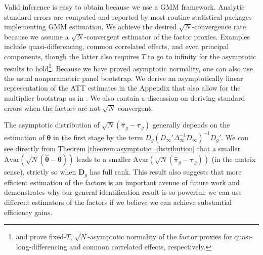 Valid inference is easy to obtain because we use a GMM framework. Analytic standard errors are computed and reported by most routine statistical packages implementing GMM estimation. We achieve the desired $\sqrt{N}$-convergence rate because we assume a $\sqrt{N}$-convergent estimator of the factor proxies. Examples include quasi-differencing, common correlated effects, and even principal components, though the latter also requires $T$ to go to infinity for the asymptotic results to hold\footnote{\citet{Ahn_Lee_Schmidt_2013} and \citet{Westerlund_Petrova_Norkute_2019} prove fixed-$T$, $\sqrt{N}$-asymptotic normality of the factor proxies for quasi-long-differencing and common correlated effects, respectively.}. Because we have proved asymptotic normality, one can also use the usual nonparametric panel bootstrap. We derive an asymptotically linear representation of the ATT estimates in the Appendix that also allow for the multiplier bootstrap as in \citet{Callaway_Karami_2020}. We also contain a discussion on deriving standard errors when the factors are not $\sqrt{N}$-convergent. 

The asymptotic distribution of $\sqrt{N}(\widehat{\bm \tau}_g - \bm \tau_{g})$ generally depends on the estimation of $\bm{\theta}$ in the first stage by the term $D_g (D_\infty' \Delta_\infty^{-1} D_\infty)^{-1} D_g'$. We can see directly from Theorem \ref{theorem:asymptotic_distribution} that a smaller $\text{Avar}(\sqrt{N}(\widehat{\bm{\theta}} - \bm{\theta}))$ leads to a smaller $\text{Avar}(\sqrt{N}(\widehat{\bm \tau}_g - \bm \tau_g))$ (in the matrix sense), strictly so when $\bm D_g$ has full rank. This result also suggests that more efficient estimation of the factors is an important avenue of future work and demonstrates why our general identification result is so powerful: we can use different estimators of the factors if we believe we can achieve substantial efficiency gains. 

